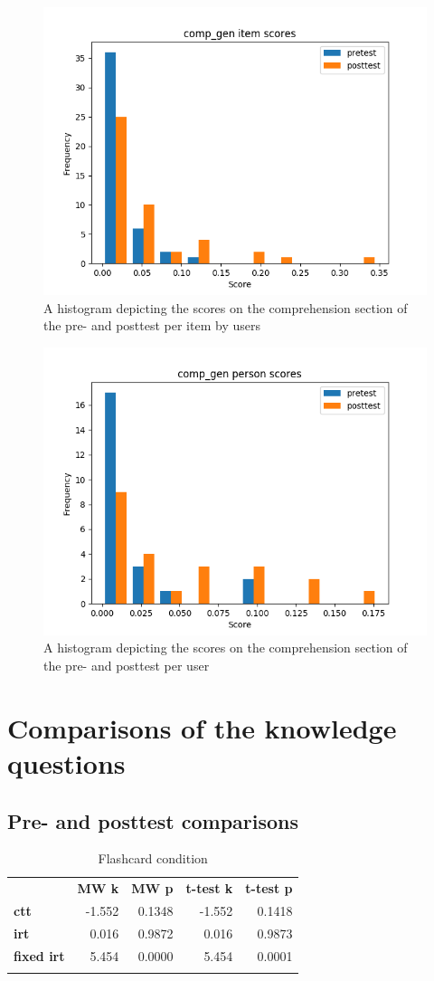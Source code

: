 \begin{figure}
    \centering
    \includegraphics[width=.7\textwidth]{img/comp_gen_diff.png}
    \caption{A histogram depicting the scores on the comprehension section of the pre- and posttest per item by users}
    \label{fig:comp_gen_diff}
\end{figure}
\begin{figure}
    \centering
    \includegraphics[width=.7\textwidth]{img/comp_gen_abil.png}
    \caption{A histogram depicting the scores on the comprehension section of the pre- and posttest per user}
    \label{fig:comp_gen_abil}
\end{figure}

\FloatBarrier
\section{Comparisons of the knowledge questions}

\FloatBarrier
\subsection{Pre- and posttest comparisons}

\begin{longtable}[c]{@{}lrrrr@{}}
\caption{Flashcard condition}
\endfirsthead
\endhead
\toprule\addlinespace
& \textbf{MW k} & \textbf{MW p} &
\textbf{t-test k} & \textbf{t-test p}
\\\addlinespace
\midrule
\textbf{ctt} & -1.552 & 0.1348 & -1.552 & 0.1418
\\\addlinespace
\textbf{irt} & 0.016 & 0.9872 & 0.016 & 0.9873
\\\addlinespace
\textbf{fixed irt} & 5.454 & 0.0000 & 5.454 & 0.0001
\\\addlinespace
\bottomrule
    \label{tab:know_pp_fc_comp}
\end{longtable}

